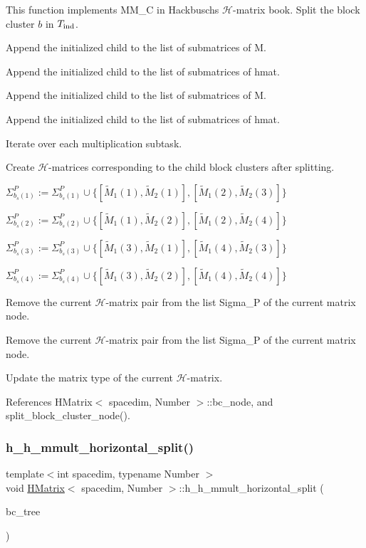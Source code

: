 This function implements {\ttfamily M\+M\+\_\+C} in Hackbusch\textquotesingle{}s $\mathcal{H}$-\/matrix book. Split the block cluster $b$ in $T_{\rm ind}$.

Append the initialized child to the list of submatrices of {\ttfamily M}.

Append the initialized child to the list of submatrices of {\ttfamily hmat}.

Append the initialized child to the list of submatrices of {\ttfamily M}.

Append the initialized child to the list of submatrices of {\ttfamily hmat}.

Iterate over each multiplication subtask.

Create $\mathcal{H}$-\/matrices corresponding to the child block clusters after splitting.

$\Sigma_{b_s(1)}^P := \Sigma_{b_s(1)}^P \cup \{[\tilde{M}_1(1), \tilde{M}_2(1)], [\tilde{M}_1(2), \tilde{M}_2(3)]\}$

$\Sigma_{b_s(2)}^P := \Sigma_{b_s(2)}^P \cup \{[\tilde{M}_1(1), \tilde{M}_2(2)], [\tilde{M}_1(2), \tilde{M}_2(4)]\}$

$\Sigma_{b_s(3)}^P := \Sigma_{b_s(3)}^P \cup \{[\tilde{M}_1(3), \tilde{M}_2(1)], [\tilde{M}_1(4), \tilde{M}_2(3)]\}$

$\Sigma_{b_s(4)}^P := \Sigma_{b_s(4)}^P \cup \{[\tilde{M}_1(3), \tilde{M}_2(2)], [\tilde{M}_1(4), \tilde{M}_2(4)]\}$

Remove the current $\mathcal{H}$-\/matrix pair from the list {\ttfamily Sigma\+\_\+P} of the current matrix node.

Remove the current $\mathcal{H}$-\/matrix pair from the list {\ttfamily Sigma\+\_\+P} of the current matrix node.

Update the matrix type of the current $\mathcal{H}$-\/matrix.

References H\+Matrix$<$ spacedim, Number $>$\+::bc\+\_\+node, and split\+\_\+block\+\_\+cluster\+\_\+node().

\mbox{\label{classHMatrix_a38c88893c6ca784d4e56653d8b0e3e67}} 
\subsubsection{\texorpdfstring{h\+\_\+h\+\_\+mmult\+\_\+horizontal\+\_\+split()}{h\_h\_mmult\_horizontal\_split()}}
{\footnotesize\ttfamily template$<$int spacedim, typename Number $>$ \\
void \hyperlink{classHMatrix}{H\+Matrix}$<$ spacedim, Number $>$\+::h\+\_\+h\+\_\+mmult\+\_\+horizontal\+\_\+split (\begin{DoxyParamCaption}\item[{\hyperlink{classBlockClusterTree}{Block\+Cluster\+Tree}$<$ spacedim, Number $>$ \&}]{bc\+\_\+tree }\end{DoxyParamCaption})}

